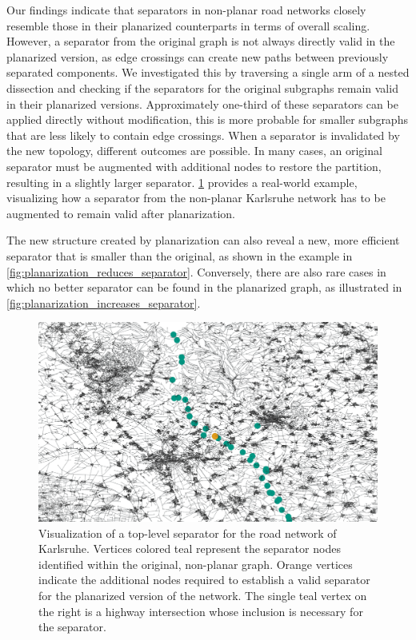 Our findings indicate that separators in non-planar road networks closely resemble those in their planarized counterparts in terms of overall scaling.
However, a separator from the original graph is not always directly valid in the planarized version, as edge crossings can create new paths between previously separated components.
We investigated this by traversing a single arm of a nested dissection and checking if the separators for the original subgraphs remain valid in their planarized versions.
Approximately one-third of these separators can be applied directly without modification, this is more probable for smaller subgraphs that are less likely to contain edge crossings.
When a separator is invalidated by the new topology, different outcomes are possible.
In many cases, an original separator must be augmented with additional nodes to restore the partition, resulting in a slightly larger separator.
\cref{fig:karlsruhe_planar_vs_non_planar} provides a real-world example, visualizing how a separator from the non-planar Karlsruhe network has to be augmented to remain valid after planarization.

The new structure created by planarization can also reveal a new, more efficient separator that is smaller than the original, as shown in the example in \cref{fig:planarization_reduces_separator}.
Conversely, there are also rare cases in which no better separator can be found in the planarized graph, as illustrated in \cref{fig:planarization_increases_separator}.

\begin{figure}[tbhp]
    \centering
    \includegraphics[width=0.7\linewidth]{graphics/karlsruhe_top_level_sep_extended_to_planar_wide.png}
    \caption{Visualization of a top-level separator for the road network of Karlsruhe. Vertices colored teal represent the separator nodes identified within the original, non-planar graph. Orange vertices indicate the additional nodes required to establish a valid separator for the planarized version of the network. The single teal vertex on the right is a highway intersection whose inclusion is necessary for the separator.}
    \label{fig:karlsruhe_planar_vs_non_planar}
\end{figure}

